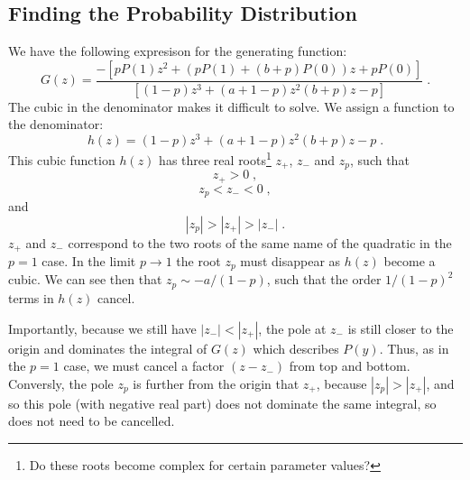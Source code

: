 \documentclass[a4paper,10pt]{article}
\newcommand{\Or}{\mathcal{O}}
\begin{document}

\subsection{Finding the Probability Distribution}

We have the following expresison for the generating function:
\begin{equation}
  G(z) = \frac{
	       - \left[ p P(1) z^2 + (pP(1) + (b+p)P(0))z + pP(0) \right] 
              }
              {
               \left[ (1-p)z^3 +(a + 1 -p) z^2 (b+p)z -p \right]
              } \;.
\end{equation}
The cubic in the denominator makes it difficult to solve. We assign a function to the denominator:
\begin{equation}
  h(z) = (1-p)z^3 +(a + 1 -p) z^2 (b+p)z -p \;.
\end{equation}
This cubic function $h(z)$ has three real roots\footnote{Do these roots become complex for certain parameter values?} $z_+$, $z_-$ and $z_p$, such that 
\begin{equation}
  z_+ > 0 \;,
\end{equation}
\begin{equation}
  z_p < z_- < 0 \;,
\end{equation}
and
\begin{equation}
  |z_p| > |z_+| > |z_-| \;. 
\end{equation}
$z_+$ and $z_-$ correspond to the two roots of the same name of the quadratic in the $p=1$ case. In the limit $p\to1$ the root $z_p$ must disappear as $h(z)$ become a cubic. We can see then that $z_p \sim -a/(1-p)$, such that the order $1/(1-p)^2$ terms in $h(z)$ cancel. 

Importantly, because we still have $|z_-| < |z_+|$, the pole at $z_-$ is still closer to the origin and dominates the integral of $G(z)$ which describes $P(y)$. Thus, as in the $p=1$ case, we must cancel a factor $(z-z_-)$ from top and bottom. Conversly, the pole $z_p$ is further from the origin that $z_+$, because $|z_p| > |z_+|$, and so this pole (with negative real part) does not dominate the same integral, so does not need to be cancelled. 
\end{document}
